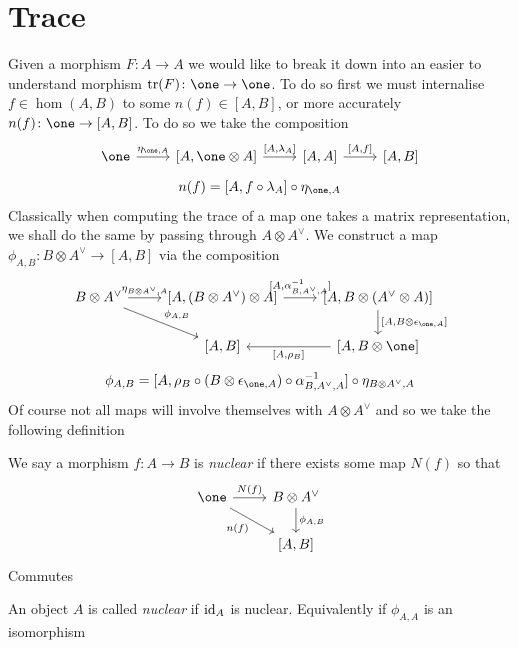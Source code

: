 \documentclass{report}
\begin{document}
\section{Trace}
Given a morphism $F \colon A \to A$ we would like to break it down into an easier to understand morphism $\operatorname{tr}(F)\colon \one \to \one$. To do so first we must internalise $f \in \hom(A,B)$ to some $n(f) \in [A,B]$, or more accurately $n(f) \colon \one \to [A,B]$. To do so we take the composition
\[
\begin{tikzcd}
\one \arrow[r, "{\eta_{\one,A}}"] & {[A,\one \otimes A]} \arrow[r, "{[A,\lambda_A]}"] & {[A,A]} \arrow[r, "{[A,f]}"] & {[A,B]}
\end{tikzcd}
\]
\[
n(f) = [A,f\circ \lambda_A] \circ \eta_{\one,A}
\]
Classically when computing the trace of a map one takes a matrix representation, we shall do the same by passing through $A \otimes A^\vee$. We construct a map $\phi_{A,B} \colon B \otimes A^\vee \to [A,B]$ via the composition
\[
\begin{tikzcd}
B \otimes A^\vee \arrow[r, "{\eta_{B \otimes A^\vee,A}}"] \arrow[rd, "{\phi_{A,B}}"] & {[A,(B \otimes A^\vee) \otimes A]} \arrow[r, "{[A,\alpha_{B,A^\vee,A}^{-1}]}"] & {[A,B \otimes (A^\vee \otimes A)]} \arrow[d, "{[A,B \otimes\epsilon_{\one,A}]}"] \\
                                                                                     & {[A,B]}                                                                        & {[A,B \otimes \one]} \arrow[l, "{[A,\rho_B]}"]                                  
\end{tikzcd}
\]
\[
\phi_{A,B}=[A,\rho_B \circ (B \otimes \epsilon_{\one,A})\circ \alpha_{B,A^\vee,A}^{-1}] \circ \eta_{B \otimes A^\vee,A}
\]
Of course not all maps will involve themselves with $A \otimes A^\vee$ and so we take the following definition
\begin{definition}
    We say a morphism $f \colon A \to B$ is \textit{nuclear} if there exists some map $N(f)$ so that
    \[
\begin{tikzcd}
\one \arrow[rd, "n(f)"'] \arrow[r, "N(f)"] & B \otimes A^\vee \arrow[d, "{\phi_{A,B}}"] \\
                                           & {[A,B]}                                   
\end{tikzcd}
    \]
    Commutes
\end{definition}
\begin{definition}
    An object $A$ is called \textit{nuclear} if $\operatorname{id}_A$ is nuclear. Equivalently if $\phi_{A,A}$ is an isomorphism
\end{definition}
\end{document}
